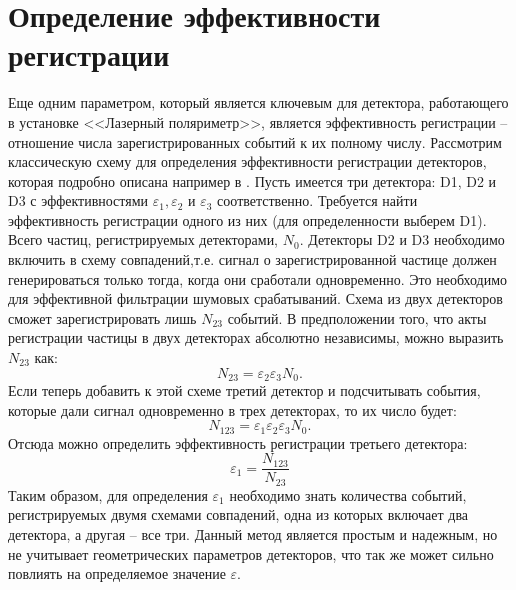 \section{Определение эффективности регистрации}
Еще одним параметром, который является ключевым для детектора, работающего в установке <<Лазерный поляриметр>>, является эффективность регистрации -- отношение числа зарегистрированных событий к их полному числу. Рассмотрим классическую схему для определения эффективности регистрации детекторов, которая подробно описана например в \cite{grupen}. Пусть имеется три детектора: D1, D2 и D3 с эффективностями $\varepsilon_1, \varepsilon_2$ и $\varepsilon_3$ соответственно. Требуется найти эффективность регистрации одного из них (для определенности выберем D1). Всего частиц, регистрируемых детекторами, $N_0$. Детекторы D2 и D3 необходимо включить в схему совпадений,т.е. сигнал о зарегистрированной частице должен генерироваться только тогда, когда они сработали одновременно. Это необходимо для эффективной фильтрации шумовых срабатываний. Схема из двух детекторов сможет зарегистрировать лишь $N_{23}$ событий. В предположении того, что акты регистрации частицы в двух детекторах абсолютно независимы, можно выразить $N_{23}$ как: 
\begin{equation}
N_{23} = \varepsilon_2\varepsilon_3 N_0.
\end{equation}
Если теперь добавить к этой схеме третий детектор и подсчитывать события, которые дали сигнал одновременно в трех детекторах, то их число будет: 
\begin{equation}
N_{123} = \varepsilon_1\varepsilon_2 \varepsilon_3 N_0.
\end{equation}
Отсюда можно определить эффективность регистрации третьего детектора: 
\begin{equation}
\varepsilon_1 = \frac{N_{123}}{N_{23}}
\end{equation}
Таким образом, для определения $\varepsilon_1$ необходимо знать количества событий, регистрируемых двумя схемами совпадений, одна из которых включает два детектора, а другая -- все три. Данный метод является простым и надежным, но не учитывает геометрических параметров детекторов, что так же может сильно повлиять на определяемое значение $\varepsilon$.
